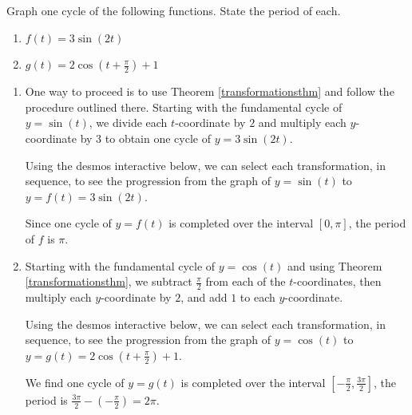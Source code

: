 \documentclass{ximera}
\begin{document}
\begin{example}  \label{cosinesinegraphex1} Graph one cycle of the following functions. State the period of each.

\begin{enumerate}

\item  $f(t) = 3 \sin(2t)$

\item  $g(t) = 2 \cos\left(t +\frac{\pi}{2} \right) +1$

\end{enumerate}

\begin{explanation}

\begin{enumerate}

\item One way to proceed is to use Theorem \ref{transformationsthm} and follow the procedure outlined there.   Starting with the fundamental cycle of $y= \sin(t)$, we divide each $t$-coordinate by $2$ and multiply each $y$-coordinate by 3 to obtain one cycle of $y = 3 \sin(2t)$.   

Using the desmos interactive below, we can select each transformation, in sequence, to see the progression from the graph of $y = \sin(t)$ to $y = f(t) = 3 \sin(2t)$.


\begin{center}
\end{center}

Since one cycle of $y=f(t)$ is completed over the interval $[0, \pi]$, the period of $f$ is $\pi$.


\item  Starting with the fundamental cycle of  $y = \cos(t)$ and using Theorem \ref{transformationsthm}, we subtract $\frac{\pi}{2}$ from each of the $t$-coordinates, then multiply each $y$-coordinate by $2$, and add $1$ to each $y$-coordinate. 

Using the desmos interactive below, we can select each transformation, in sequence, to see the progression from the graph of $y = \cos(t)$ to $y = g(t) = 2 \cos\left(t +\frac{\pi}{2} \right) +1$.


\begin{center}
\end{center}

We find one cycle of $y=g(t)$ is completed over the interval $\left[ -\frac{\pi}{2}, \frac{3\pi}{2} \right]$, the period is $\frac{3\pi}{2} - \left(- \frac{\pi}{2} \right) = 2\pi$. 

\end{enumerate}
\end{explanation}

\end{example}
\end{document}
